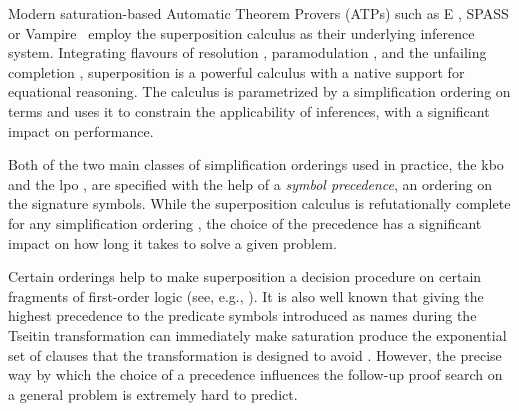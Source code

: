 




Modern saturation-based Automatic Theorem Provers (ATPs) such as E \cite{SCV:CADE-2019}, SPASS \cite{DBLP:conf/cade/WeidenbachDFKSW09} 
or {\sc Vampire}~\cite{DBLP:conf/cav/KovacsV13}
employ the superposition calculus \cite{DBLP:journals/logcom/BachmairG94,DBLP:books/el/RV01/NieuwenhuisR01} as their underlying inference system.
Integrating flavours of resolution \cite{DBLP:books/el/RV01/BachmairG01}, paramodulation \cite{Robinson1983}, and 
the unfailing completion \cite{Bachmair89completionwithout}, superposition is a powerful calculus with 
a native support for equational reasoning. The calculus is parametrized by a simplification ordering on terms %
and uses it to constrain the applicability of inferences, with a significant impact on performance.

Both of the two main classes of simplification orderings used in practice,
the \acrlong*{kbo} \cite{Knuth1983}
and the \acrlong*{lpo} \cite{Kamin1980},
are specified with the help of a 
\emph{symbol precedence}, an ordering on the signature symbols. %
While the superposition calculus is refutationally complete for any simplification ordering \cite{DBLP:journals/logcom/BachmairG94},
the choice of the precedence has a significant impact on how long it takes to solve a given problem.

Certain orderings help to make superposition a decision procedure on certain fragments of first-order logic 
(see, e.g., \cite{DBLP:conf/lics/GanzingerN99,DBLP:conf/cade/HustadtKS05}).
It is also well known that giving the highest precedence to the predicate symbols introduced as names 
during the Tseitin transformation %
\cite{Tseitin1983} can immediately make saturation produce the exponential 
set of clauses that the transformation is designed to avoid \cite{Reger2016}.
%
However, the precise way by which the choice of a precedence 
influences the follow-up proof search on a general problem is extremely hard to predict. %

